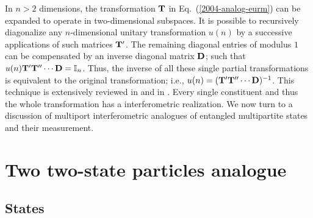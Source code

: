 \documentclass[pra,showpacs,showkeys,amsfonts]{revtex4}
\begin{document}
In $n>2$ dimensions,
the transformation ${\bf T}$ in Eq.~(\ref{2004-analog-eurm}) can be expanded to operate
in two-dimensional subspaces.
It is possible to recursively diagonalize any $n$-dimensional unitary transformation
$u(n)$ by
a successive applications of such matrices ${\bf T}'$.
The remaining diagonal entries of modulus $1$
can be compensated by an inverse diagonal matrix ${\bf D}$; such that
$u(n){\bf T}'{\bf T}'' \cdots {\bf D} ={\Bbb I}_n$.
Thus,
the inverse of all these single partial transformations is equivalent to the original transformation;
i.e., $u(n)=({\bf T}'{\bf T}'' \cdots {\bf D})^{-1}$.
This technique is extensively reviewed in \cite[Chapter 2]{murnaghan}
and in \cite{rzbb,reck-94}.
Every single constituent and thus the whole transformation has a
interferometric realization.
We now turn to a discussion of multiport interferometric analogues of entangled multipartite states
and their measurement.


\section{Two two-state particles analogue}


\subsection{States}
\end{document}
